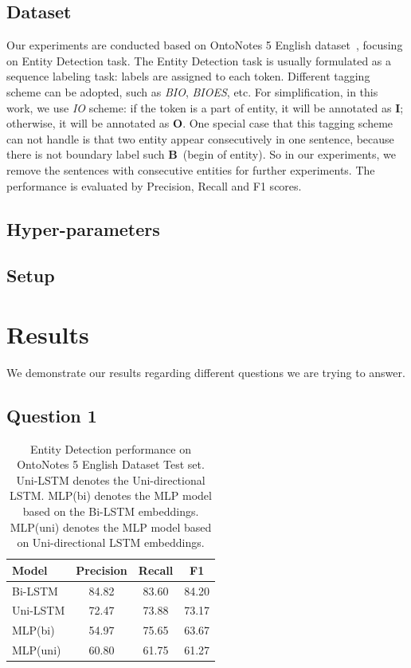 \documentclass{article}
\begin{document}
\subsection{Dataset} 

Our experiments are conducted based on OntoNotes 5 English dataset~\cite{weischedel2012ontonotes}, focusing on Entity Detection task. The Entity Detection task is usually formulated as a sequence labeling task: labels are assigned to each token. Different tagging scheme can be adopted, such as \textit{BIO}, \textit{BIOES}, etc. For simplification, in this work, we use \textit{IO} scheme: if the token is a part of entity, it will be annotated as \textbf{I}; otherwise, it will be annotated as \textbf{O}. One special case that this tagging scheme can not handle is that two entity appear consecutively in one sentence, because there is not boundary label such \textbf{B}~(begin of entity). So in our experiments, we remove the sentences with consecutive entities for further experiments. The performance is evaluated by Precision, Recall and F1 scores.

\subsection{Hyper-parameters}


\subsection{Setup}

\section{Results}

We demonstrate our results regarding different questions we are trying to answer. 

\subsection{Question 1}

\begin{table}[t]
	\centering
	\begin{tabular}{l@{\qquad}ccc}
		\toprule
		\textbf{Model}         & \textbf{Precision} & \textbf{Recall} & \textbf{F1} \\ \midrule
		Bi-LSTM &  84.82 & 83.60  & 84.20 \\
		Uni-LSTM & 72.47 & 73.88 & 73.17 \\
		MLP(bi) & 54.97 & 75.65 & 63.67 \\ 
		MLP(uni) & 60.80 & 61.75 &  61.27 \\ 
		\bottomrule
	\end{tabular}
	\vspace{3mm}
	\caption{Entity Detection performance on OntoNotes 5 English Dataset Test set. Uni-LSTM denotes the Uni-directional LSTM. MLP(bi) denotes the MLP model based on the Bi-LSTM embeddings. MLP(uni) denotes the MLP model based on Uni-directional LSTM embeddings.}
	\label{res:ner}
\end{table}
\end{document}
